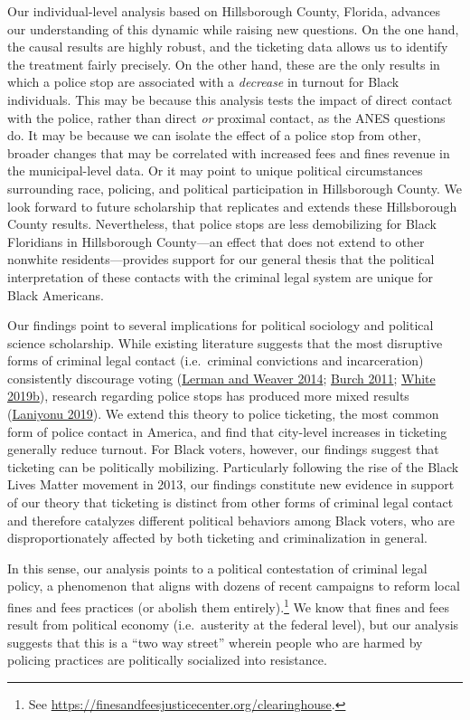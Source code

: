 \documentclass[
  12pt,
]{article}
\begin{document}
Our individual-level analysis based on Hillsborough County, Florida, advances our understanding of this dynamic while raising new questions. On the one hand, the causal results are highly robust, and the ticketing data allows us to identify the treatment fairly precisely. On the other hand, these are the only results in which a police stop are associated with a \emph{decrease} in turnout for Black individuals. This may be because this analysis tests the impact of direct contact with the police, rather than direct \emph{or} proximal contact, as the ANES questions do. It may be because we can isolate the effect of a police stop from other, broader changes that may be correlated with increased fees and fines revenue in the municipal-level data. Or it may point to unique political circumstances surrounding race, policing, and political participation in Hillsborough County. We look forward to future scholarship that replicates and extends these Hillsborough County results. Nevertheless, that police stops are less demobilizing for Black Floridians in Hillsborough County---an effect that does not extend to other nonwhite residents---provides support for our general thesis that the political interpretation of these contacts with the criminal legal system are unique for Black Americans.

Our findings point to several implications for political sociology and political science scholarship. While existing literature suggests that the most disruptive forms of criminal legal contact (i.e.~criminal convictions and incarceration) consistently discourage voting (\protect\hyperlink{ref-Lerman2014}{Lerman and Weaver 2014}; \protect\hyperlink{ref-Burch2011}{Burch 2011}; \protect\hyperlink{ref-White2019a}{White 2019b}), research regarding police stops has produced more mixed results (\protect\hyperlink{ref-Laniyonu2019}{Laniyonu 2019}). We extend this theory to police ticketing, the most common form of police contact in America, and find that city-level increases in ticketing generally reduce turnout. For Black voters, however, our findings suggest that ticketing can be politically mobilizing. Particularly following the rise of the Black Lives Matter movement in 2013, our findings constitute new evidence in support of our theory that ticketing is distinct from other forms of criminal legal contact and therefore catalyzes different political behaviors among Black voters, who are disproportionately affected by both ticketing and criminalization in general.

In this sense, our analysis points to a political contestation of criminal legal policy, a phenomenon that aligns with dozens of recent campaigns to reform local fines and fees practices (or abolish them entirely).\footnote{See \url{https://finesandfeesjusticecenter.org/clearinghouse}.} We know that fines and fees result from political economy (i.e.~austerity at the federal level), but our analysis suggests that this is a ``two way street'' wherein people who are harmed by policing practices are politically socialized into resistance.
\end{document}
